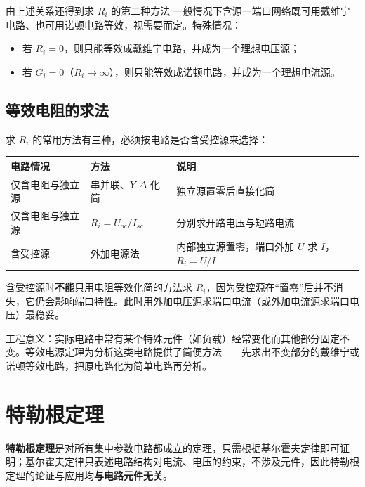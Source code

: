 由上述关系还得到求 $R_i$ 的第二种方法
一般情况下含源一端口网络既可用戴维宁电路、也可用诺顿电路等效，视需要而定。特殊情况：
\begin{itemize}
  \item 若 $R_i=0$，则只能等效成戴维宁电路，并成为一个理想电压源；
  \item 若 $G_i=0$（$R_i\to\infty$），则只能等效成诺顿电路，并成为一个理想电流源。
\end{itemize}

\subsection{等效电阻的求法}
求 $R_i$ 的常用方法有三种，必须按电路是否含受控源来选择：

\begin{center}
\begin{tabular}{@{}lll@{}}
\toprule
电路情况 & 方法 & 说明 \\
\midrule
仅含电阻与独立源 & 串并联、$Y$-$\Delta$ 化简 & 独立源置零后直接化简 \\
仅含电阻与独立源 & $R_i=U_{oc}/I_{sc}$ & 分别求开路电压与短路电流 \\
含受控源 & 外加电源法 & 内部独立源置零，端口外加 $U$ 求 $I$，$R_i=U/I$ \\
\bottomrule
\end{tabular}
\end{center}

含受控源时\textbf{不能}只用电阻等效化简的方法求 $R_i$，因为受控源在“置零”后并不消失，它仍会影响端口特性。此时用外加电压源求端口电流（或外加电流源求端口电压）最稳妥。

工程意义：实际电路中常有某个特殊元件（如负载）经常变化而其他部分固定不变。等效电源定理为分析这类电路提供了简便方法——先求出不变部分的戴维宁或诺顿等效电路，把原电路化为简单电路再分析。


\section{特勒根定理}
\textbf{特勒根定理}是对所有集中参数电路都成立的定理，只需根据基尔霍夫定律即可证明；基尔霍夫定律只表述电路结构对电流、电压的约束，不涉及元件，因此特勒根定理的论证与应用均\textbf{与电路元件无关}。

